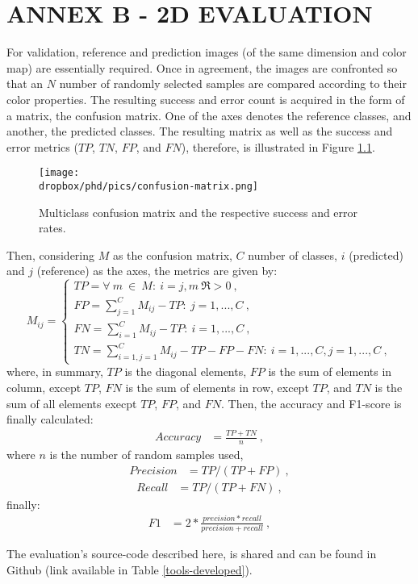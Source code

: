 \chapter{ANNEX B - 2D EVALUATION}\label{annexB} 
For validation, reference and prediction images (of the same dimension and color map) are essentially required. Once in agreement, the images are confronted so that an $N$ number of randomly selected samples are compared according to their color properties. The resulting success and error count is acquired in the form of a matrix, the confusion matrix. One of the axes denotes the reference classes, and another, the predicted classes. The resulting matrix as well as the success and error metrics ($TP$, $TN$, $FP$, and $FN$), therefore, is illustrated in Figure \ref{cm-representation}.
\begin{figure}[H]
    \centering    
    \caption{Multiclass confusion matrix and the respective success and error rates.}
    \vspace{6mm}
    \texttt{[image: \\dropbox/phd/pics/confusion-matrix.png]}       
	\legenda{}
    \label{cm-representation}
\end{figure}

Then, considering $M$ as the confusion matrix, $C$ number of classes, $i$ (predicted) and $j$ (reference) as the axes, the metrics are given by:
\begin{equation}
 M_{ij}=
 \begin{cases}
  TP = {\forall~m~\in~M:~i=j,m~\Re>0}~,\\  
  FP = {\sum_{j=1}^CM_{ij}-TP:~j={1,...,C}}~,\\
  FN = {\sum_{i=1}^CM_{ij}-TP:~i={1,...,C}}~,\\
  TN = {\sum_{i=1,j=1}^CM_{ij} - TP - FP - FN:~i={1,...,C},j={1,...,C}}~,
 \end{cases}
\end{equation}
where, in summary, $TP$ is the diagonal elements, $FP$ is the sum of elements in column, except $TP$, $FN$ is the sum of elements in row, except $TP$, and $TN$ is the sum of all elements execpt $TP$, $FP$, and $FN$. Then, the accuracy and F1-score is finally calculated:
\begin{align}
 Accuracy &= \frac{TP + TN}{n}~,
\end{align}
where $n$ is the number of random samples used, 
\begin{align}
 Precision &= TP/(TP+FP)~,
\end{align}
\begin{align}
 Recall &= TP/(TP+FN)~,
\end{align}
finally:
\begin{align}
 F1 &= 2 * \frac{precision * recall}{precision + recall}~, 
\end{align}

The evaluation's source-code described here, is shared and can be found in Github (link available in Table \ref{tools-developed}).
